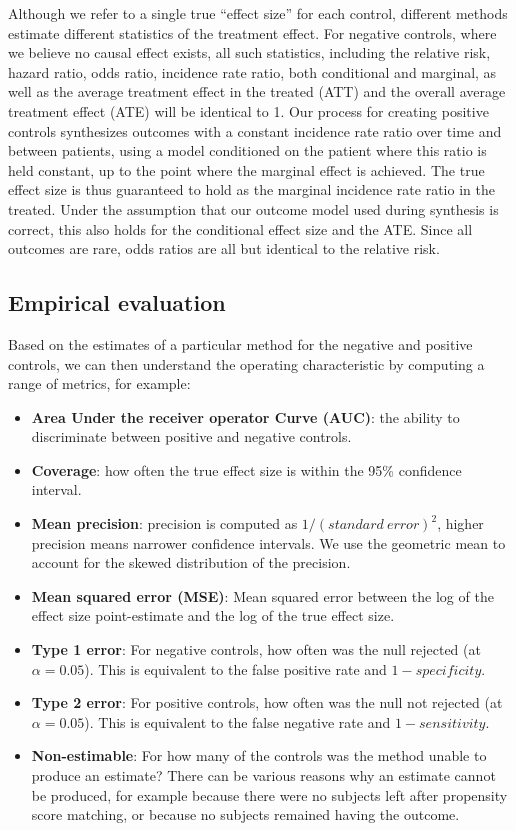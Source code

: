 \documentclass[11pt]{book}
\providecommand{\tightlist}{%
  \setlength{\itemsep}{0pt}\setlength{\parskip}{0pt}}
\begin{document}
Although we refer to a single true ``effect size'' for each control,
different methods estimate different statistics of the treatment effect.
For negative controls, where we believe no causal effect exists, all
such statistics, including the relative risk, hazard ratio, odds ratio,
incidence rate ratio, both conditional and marginal, as well as the
average treatment effect in the treated (ATT) and the overall average
treatment effect (ATE) will be identical to 1. Our process for creating
positive controls synthesizes outcomes with a constant incidence rate
ratio over time and between patients, using a model conditioned on the
patient where this ratio is held constant, up to the point where the
marginal effect is achieved. The true effect size is thus guaranteed to
hold as the marginal incidence rate ratio in the treated. Under the
assumption that our outcome model used during synthesis is correct, this
also holds for the conditional effect size and the ATE. Since all
outcomes are rare, odds ratios are all but identical to the relative
risk.

\subsection{Empirical evaluation}\label{empirical-evaluation}

Based on the estimates of a particular method for the negative and
positive controls, we can then understand the operating characteristic
by computing a range of metrics, for example:

\begin{itemize}
\tightlist
\item
  \textbf{Area Under the receiver operator Curve (AUC)}: the ability to
  discriminate between positive and negative controls.
\item
  \textbf{Coverage}: how often the true effect size is within the 95\%
  confidence interval.
\item
  \textbf{Mean precision}: precision is computed as
  \(1/(standard\ error)^2\), higher precision means narrower confidence
  intervals. We use the geometric mean to account for the skewed
  distribution of the precision.
\item
  \textbf{Mean squared error (MSE)}: Mean squared error between the log
  of the effect size point-estimate and the log of the true effect size.
\item
  \textbf{Type 1 error}: For negative controls, how often was the null
  rejected (at \(\alpha = 0.05\)). This is equivalent to the false
  positive rate and \(1 - specificity\).
\item
  \textbf{Type 2 error}: For positive controls, how often was the null
  not rejected (at \(\alpha = 0.05\)). This is equivalent to the false
  negative rate and \(1 - sensitivity\).
\item
  \textbf{Non-estimable}: For how many of the controls was the method
  unable to produce an estimate? There can be various reasons why an
  estimate cannot be produced, for example because there were no
  subjects left after propensity score matching, or because no subjects
  remained having the outcome.
\end{itemize}
\end{document}

